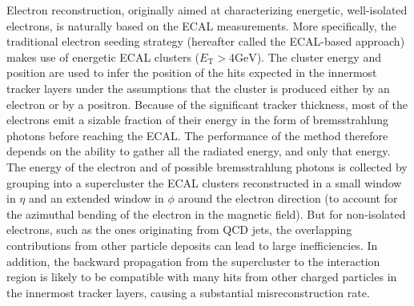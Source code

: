 Electron reconstruction, originally aimed at characterizing energetic, well-isolated electrons, is naturally based on the ECAL measurements. More specifically, the traditional electron seeding strategy (hereafter called the ECAL-based approach) \cite{2015} makes use of energetic ECAL clusters ($E_{\mathrm{T}}>4 \mathrm{GeV}$).  The cluster energy and position are used to infer the position of the hits expected in the innermost tracker layers under the assumptions that the cluster is produced either by an electron or by a positron.  Because of the significant tracker thickness, most of the electrons emit a sizable fraction of their energy in the form of bremsstrahlung photons before reaching the ECAL. The performance of the method therefore depends on the ability to gather all the radiated energy, and only that energy.  The energy of the electron and of possible bremsstrahlung photons is collected by grouping into a supercluster the ECAL clusters reconstructed in a small window in $\eta$ and an extended window in $\phi$ around the electron direction (to account for the azimuthal bending of the electron in the magnetic field). But for non-isolated electrons, such as the ones originating from QCD jets, the overlapping contributions from other particle deposits can lead to large inefficiencies. In addition, the backward propagation from the supercluster to the interaction region is likely to be compatible with many hits from other charged particles in the innermost tracker layers, causing a substantial misreconstruction rate.

